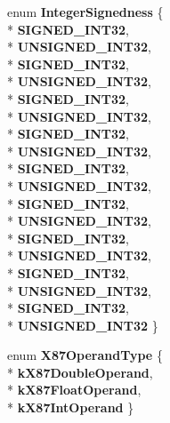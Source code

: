 \begin{DoxyCompactItemize}
\item 
enum {\bfseries Integer\+Signedness} \{ \\*
{\bfseries S\+I\+G\+N\+E\+D\+\_\+\+I\+N\+T32}, 
\\*
{\bfseries U\+N\+S\+I\+G\+N\+E\+D\+\_\+\+I\+N\+T32}, 
\\*
{\bfseries S\+I\+G\+N\+E\+D\+\_\+\+I\+N\+T32}, 
\\*
{\bfseries U\+N\+S\+I\+G\+N\+E\+D\+\_\+\+I\+N\+T32}, 
\\*
{\bfseries S\+I\+G\+N\+E\+D\+\_\+\+I\+N\+T32}, 
\\*
{\bfseries U\+N\+S\+I\+G\+N\+E\+D\+\_\+\+I\+N\+T32}, 
\\*
{\bfseries S\+I\+G\+N\+E\+D\+\_\+\+I\+N\+T32}, 
\\*
{\bfseries U\+N\+S\+I\+G\+N\+E\+D\+\_\+\+I\+N\+T32}, 
\\*
{\bfseries S\+I\+G\+N\+E\+D\+\_\+\+I\+N\+T32}, 
\\*
{\bfseries U\+N\+S\+I\+G\+N\+E\+D\+\_\+\+I\+N\+T32}, 
\\*
{\bfseries S\+I\+G\+N\+E\+D\+\_\+\+I\+N\+T32}, 
\\*
{\bfseries U\+N\+S\+I\+G\+N\+E\+D\+\_\+\+I\+N\+T32}, 
\\*
{\bfseries S\+I\+G\+N\+E\+D\+\_\+\+I\+N\+T32}, 
\\*
{\bfseries U\+N\+S\+I\+G\+N\+E\+D\+\_\+\+I\+N\+T32}, 
\\*
{\bfseries S\+I\+G\+N\+E\+D\+\_\+\+I\+N\+T32}, 
\\*
{\bfseries U\+N\+S\+I\+G\+N\+E\+D\+\_\+\+I\+N\+T32}, 
\\*
{\bfseries S\+I\+G\+N\+E\+D\+\_\+\+I\+N\+T32}, 
\\*
{\bfseries U\+N\+S\+I\+G\+N\+E\+D\+\_\+\+I\+N\+T32}
 \}\hypertarget{classv8_1_1internal_1_1_l_code_gen_a29a982d57fb7548092bffc62539543b6}{}\label{classv8_1_1internal_1_1_l_code_gen_a29a982d57fb7548092bffc62539543b6}

\item 
enum {\bfseries X87\+Operand\+Type} \{ \\*
{\bfseries k\+X87\+Double\+Operand}, 
\\*
{\bfseries k\+X87\+Float\+Operand}, 
\\*
{\bfseries k\+X87\+Int\+Operand}
 \}\hypertarget{classv8_1_1internal_1_1_l_code_gen_af8ce819595e7d850d20cd792141de509}{}\label{classv8_1_1internal_1_1_l_code_gen_af8ce819595e7d850d20cd792141de509}


\end{DoxyCompactItemize}

